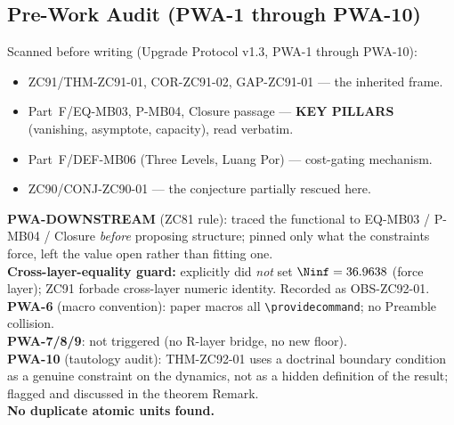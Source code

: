 \documentclass[12pt, a4paper]{article}
\begin{document}
\subsection{Pre-Work Audit (PWA-1 through PWA-10)}

\begin{formalbox}[title={Pre-Work Audit Record --- ZC92}]
Scanned before writing (Upgrade Protocol v1.3, PWA-1 through PWA-10):
\begin{itemize}[leftmargin=2em, noitemsep]
  \item ZC91/THM-ZC91-01, COR-ZC91-02, GAP-ZC91-01 --- the inherited frame.
  \item Part~F/EQ-MB03, P-MB04, Closure passage --- \textbf{KEY PILLARS}
    (vanishing, asymptote, capacity), read verbatim.
  \item Part~F/DEF-MB06 (Three Levels, Luang Por) --- cost-gating mechanism.
  \item ZC90/CONJ-ZC90-01 --- the conjecture partially rescued here.
\end{itemize}

\textbf{PWA-DOWNSTREAM} (ZC81 rule): traced the functional to EQ-MB03 /
P-MB04 / Closure \emph{before} proposing structure; pinned only what the
constraints force, left the value open rather than fitting one.\\
\textbf{Cross-layer-equality guard:} explicitly did \emph{not} set
$\Ninf=36.9638$ (force layer); ZC91 forbade cross-layer numeric identity.
Recorded as OBS-ZC92-01.\\
\textbf{PWA-6} (macro convention): paper macros all
\texttt{\textbackslash providecommand}; no Preamble collision.\\
\textbf{PWA-7/8/9}: not triggered (no R-layer bridge, no new floor).\\
\textbf{PWA-10} (tautology audit): THM-ZC92-01 uses a doctrinal boundary
condition as a genuine constraint on the dynamics, not as a hidden
definition of the result; flagged and discussed in the theorem Remark.\\
\textbf{No duplicate atomic units found.}
\end{formalbox}

\newpage


\end{document}
